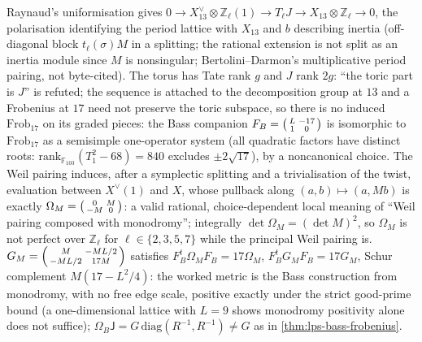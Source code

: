 \begin{proposition} %
\label{prop:toric-filtration-not-frobenius}
Raynaud's uniformisation gives $0\to X_{13}^\vee\otimes\mathbb Z_\ell(1)\to T_\ell J\to X_{13}\otimes\mathbb Z_\ell\to0$, the polarisation identifying the period
lattice with $X_{13}$ and $b$ describing inertia (off-diagonal block $t_\ell(\sigma)M$ in a splitting; the rational extension is not split
as an inertia module since $M$ is nonsingular; Bertolini--Darmon's multiplicative period pairing, not byte-cited). The torus has
Tate rank $g$ and $J$ rank $2g$: ``the toric part is $J$'' is refuted; the sequence is attached to the decomposition group at $13$ and
a Frobenius at $17$ need not preserve the toric subspace, so there is no induced $\mathrm{Frob}_{17}$ on its graded pieces: the Bass
companion $F_B = \begin{psmallmatrix}L&-17\\1&0\end{psmallmatrix}$ is isomorphic to $\mathrm{Frob}_{17}$ as a semisimple one-operator system
(all quadratic factors have distinct roots: $\mathrm{rank}_{\mathbb F_{103}}(T_1^2-68) = 840$ excludes $\pm2\sqrt{17}$), by a noncanonical choice.
The Weil pairing induces, after a symplectic splitting and a trivialisation of the twist, evaluation between $X^\vee(1)$ and $X$,
whose pullback along $(a,b)\mapsto(a,Mb)$ is exactly $\Omega_M = \begin{psmallmatrix}0&M\\-M&0\end{psmallmatrix}$: a valid rational, %
choice-dependent local meaning of ``Weil pairing composed with monodromy''; integrally $\det\Omega_M = (\det M)^2$, so $\Omega_M$ is not %
perfect over $\mathbb Z_\ell$ for $\ell\in\{2,3,5,7\}$ while the principal Weil pairing is. $G_M = \begin{psmallmatrix}M&-ML/2\\-ML/2&17M\end{psmallmatrix}$
satisfies $F_B^{t}\Omega_MF_B = 17\Omega_M$, $F_B^{t}G_MF_B = 17G_M$, Schur complement $M(17-L^2/4)$: the worked metric is the Bass %
construction from monodromy, with no free edge scale, positive exactly under the strict good-prime bound (a one-dimensional
lattice with $L = 9$ shows monodromy positivity alone does not suffice); $\Omega_B\mathsf J = G\,\mathrm{diag}(R^{-1},R^{-1})\ne G$ as in %
\cref{thm:lps-bass-frobenius}.
\end{proposition}

